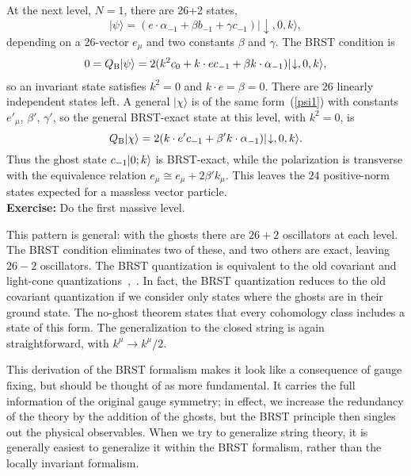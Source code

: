At the next level, $N=1$, there are 26+2 states,
\begin{equation}
|\psi \rangle = (e \cdot \alpha_{-1} + \beta b_{-1} + \gamma c_{-1} )
|\! \downarrow, 0, k \rangle, \label{psi1}
\end{equation}
depending on a 26-vector $e_\mu$
and two constants $\beta$ and $\gamma$.
The BRST condition is
\begin{eqnarray}
0  =  Q_{\rm B} \mbox{$| \psi \rangle$} = 2(k^2 c_0 + k \cdot e c_{-1} + \beta k
\cdot \alpha_{-1})  |\! \downarrow, 0, k \rangle ,
\end{eqnarray}
so an invariant state satisfies $k^2 = 0$ and $k \cdot e = \beta = 0$. 
There are $26$ linearly independent states left.  A general
$|\chi\rangle$ is of the same form~(\ref{psi1}) with constants
$e'_\mu$, $\beta'$, $\gamma'$, so the general BRST-exact state at this
level, with $k^2 = 0$, is
\begin{equation}
Q_{\rm B} \mbox{$| \chi \rangle$} = 2(k \cdot e' c_{-1} + \beta' k \cdot
\alpha_{-1})  |\! \downarrow, 0, k \rangle.
\end{equation}
Thus the ghost state $c_{-1}\mbox{$| 0;k \rangle$}$ is BRST-exact,
while the polarization is
transverse with the equivalence relation
$e_\mu \cong e_\mu +2 \beta' k_\mu$.
This leaves the $24$ positive-norm states expected for a massless vector
particle.\\[3pt]
{\bf Exercise:} Do the first massive level.

This pattern is general: with the ghosts there are $26 + 2$
oscillators at each level.  The BRST condition eliminates two
of these, and two others are exact, leaving $26 - 2$ oscillators.
The BRST quantization is equivalent to the old covariant and
light-cone quantizations~\cite{KO},~\cite{FO}.  In fact, the BRST
quantization reduces to the old covariant quantization if we
consider only states where the ghosts are in their ground state. 
The no-ghost theorem states that every cohomology class includes a
state of this form. The generalization to the closed string is again
straightforward, with $k^\mu \to k^\mu/2.$  

This derivation of the BRST formalism makes it look like a
consequence of gauge fixing, but should be thought of as more
fundamental.  It carries the full information of the original gauge
symmetry; in effect, we increase the redundancy of the theory by the
addition of the ghosts, but the BRST principle then singles out the
physical observables.  When we try to generalize string theory, it is
generally easiest to generalize it within the BRST formalism, rather
than the locally invariant formalism.

